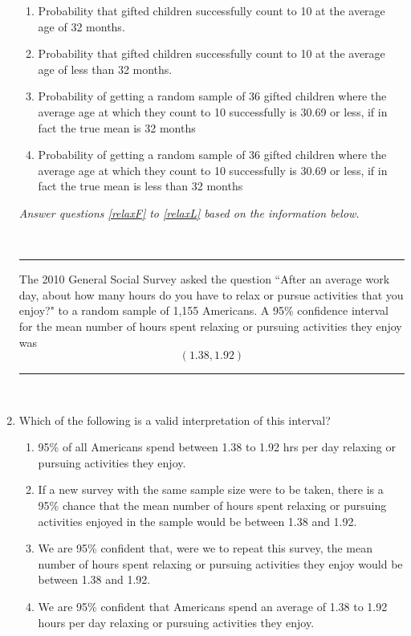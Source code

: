 \documentclass[11pt]{article}
\newcommand{\solnMult}[1]{ #1 }
\begin{document}
\begin{enumerate}
\begin{enumerate}
\item Probability that gifted children successfully count to 10 at the average age of 32 months.
\item Probability that gifted children successfully count to 10 at the average age of less than 32 months.
\item \solnMult{Probability of getting a random sample of 36 gifted children where the average age at which they 
count to 10 successfully is 30.69 or less, if in fact the true mean is 32 months}
\item Probability of getting a random sample of 36 gifted children where the average age at which they count to 10 
successfully is 30.69 or less, if in fact the true mean is less than 32 months
\end{enumerate}

\vfill


\pagebreak

\begin{center}
\textit{Answer questions \ref{relaxF} to \ref{relaxL} based on the information below.}
\end{center}
$\:$
\hrule
The 2010 General Social Survey asked the question ``After an average work day, about how many hours do you 
have to relax or pursue activities that you enjoy?" to a random sample of 1,155 Americans. A 95\% confidence 
interval for the mean number of hours spent relaxing or pursuing activities they enjoy was	
\[ (1.38, 1.92) \]
\hrule
$\:$


\item \label{relaxF} Which of the following is a valid interpretation of this interval?
\begin{enumerate}
\item 95\% of all Americans spend between 1.38 to 1.92 hrs per day relaxing or pursuing activities they enjoy.
\item If a new survey with the same sample size were to be taken, there is a 95\% chance that the mean number of 
hours spent relaxing or pursuing activities enjoyed in the sample would be between 1.38 and 1.92.
\item We are 95\% confident that, were we to repeat this survey, the mean number of hours spent relaxing or pursuing 
activities they enjoy would be between 1.38 and 1.92.
\item \solnMult{We are 95\% confident that Americans spend an average of 1.38 to 1.92 hours per day  relaxing or 
pursuing activities they enjoy.} \\
\end{enumerate}


\end{enumerate}
\end{document}
